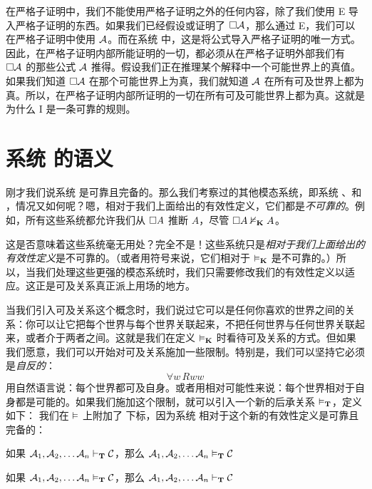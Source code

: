 在严格子证明中，我们不能使用严格子证明之外的任何内容，除了我们使用 \ebox E 导入严格子证明的东西。如果我们已经假设或证明了 $\Box \mathcal{A}$，那么通过 \ebox E，我们可以在严格子证明中使用 $\mathcal{A}$。而在系统 \mlK 中，这是将公式导入严格子证明的唯一方式。因此，在严格子证明内部所能证明的一切，都必须从在严格子证明外部我们有 $\Box \mathcal{A}$ 的那些公式 $\mathcal{A}$ 推得。假设我们正在推理某个解释中一个可能世界上的真值。如果我们知道 $\Box\mathcal{A}$ 在那个可能世界上为真，我们就知道 $\mathcal{A}$ 在所有可及世界上都为真。所以，在严格子证明内部所证明的一切在所有可及可能世界上都为真。这就是为什么 \ebox I 是一条可靠的规则。

\section{系统 \mlT 的语义}
\label{SemanticsT}

刚才我们说系统 \mlK 是可靠且完备的。那么我们考察过的其他模态系统，即系统 \mlT、\mlSfour 和 \mlSfive，情况又如何呢？嗯，相对于我们上面给出的有效性定义，它们都是\emph{不可靠的}。例如，所有这些系统都允许我们从 $\Box A$ 推断 $A$，尽管 $\Box A\nvDash_{\mathbf{K}} A$。

这是否意味着这些系统毫无用处？完全不是！这些系统只是\emph{相对于我们上面给出的有效性定义}是不可靠的。（或者用符号来说，它们相对于 $\vDash_{\mathbf{K}}$ 是不可靠的。）所以，当我们处理这些更强的模态系统时，我们只需要修改我们的有效性定义以适应。这正是可及关系真正派上用场的地方。

当我们引入可及关系这个概念时，我们说过它可以是任何你喜欢的世界之间的关系：你可以让它把每个世界与每个世界关联起来，不把任何世界与任何世界关联起来，或者介于两者之间。这就是我们在定义 $\vDash_{\mathbf{K}}$ 时看待可及关系的方式。但如果我们愿意，我们可以开始对可及关系施加一些限制。特别是，我们可以坚持它必须是\emph{自反的}：
\[\forall w\, Rww\]
用自然语言说：每个世界都可及自身。或者用相对可能性来说：每个世界相对于自身都是可能的。如果我们施加这个限制，就可以引入一个新的后承关系 $\vDash_{\mathbf{T}}$，定义如下：
我们在 $\vDash$ 上附加了 \mlT{} 下标，因为系统 \mlT{} 相对于这个新的有效性定义是可靠且完备的：


\begin{compactlist}
	\item 如果 $\mathcal{A}_1,\mathcal{A}_2, \dots \mathcal{A}_n\vdash_{\mathbf{T}}\mathcal{C}$，那么 $\mathcal{A}_1,\mathcal{A}_2, \dots \mathcal{A}_n\vDash_{\mathbf{T}}\mathcal{C}$
	\item 如果 $\mathcal{A}_1,\mathcal{A}_2, \dots \mathcal{A}_n\vDash_{\mathbf{T}}\mathcal{C}$，那么 $\mathcal{A}_1,\mathcal{A}_2, \dots \mathcal{A}_n\vdash_{\mathbf{T}}\mathcal{C}$
\end{compactlist}


